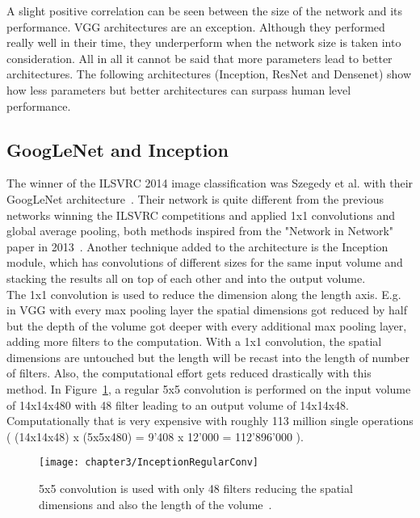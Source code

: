 A slight positive correlation can be seen between the size of the network and its performance. VGG architectures are an exception. Although they performed really well in their time, they underperform when the network size is taken into consideration. All in all it cannot be said that more parameters  lead to better architectures. The following architectures (Inception, ResNet and Densenet) show how less parameters but better architectures can surpass human level performance.\\


\subsection{GoogLeNet and Inception}

The winner of the ILSVRC 2014 image classification was Szegedy et al. with their GoogLeNet architecture~\cite{szegedy2015going}. Their network is quite different from the previous networks winning the ILSVRC competitions and applied 1x1 convolutions and global average pooling, both methods inspired from the "Network in Network" paper in 2013~\cite{lin2013network}. Another technique added to the architecture is the Inception module, which has convolutions of different sizes for the same input volume and stacking the results all on top of each other and into the output volume. \\

The 1x1 convolution is used to reduce the dimension along the length axis. E.g. in VGG with every max pooling layer the spatial dimensions got reduced by half but the depth of the volume got deeper with every additional max pooling layer, adding more filters to the computation. With a 1x1 convolution, the spatial dimensions are untouched but the length will be recast into the length of number of filters. Also, the computational effort gets reduced drastically with this method. In Figure~\ref{fig:InceptionRegularConv}, a regular 5x5 convolution is performed on the input volume of 14x14x480 with 48 filter leading to an output volume of 14x14x48. Computationally that is very expensive with roughly 113 million single operations ( (14x14x48) x (5x5x480) = 9'408 x 12'000 = 112'896'000 ).\\


\begin{figure}[!h]
  \centering
  \caption{5x5 convolution is used with only 48 filters reducing the spatial dimensions and also the length of the volume~\cite{ReviewGoogleLeNetv1}.}
  \texttt{[image: chapter3/InceptionRegularConv]}
  \label{fig:InceptionRegularConv}
\end{figure}

